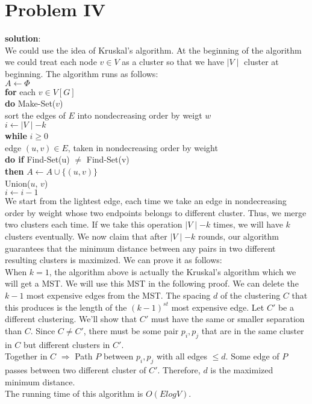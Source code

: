 \section{Problem IV}
\textbf{solution}:\\
We could use the idea of Kruskal's algorithm. At the beginning of the algorithm we could treat each node $v \in V$ as a cluster so that we have $\mid V \mid$ cluster at beginning. The algorithm runs as follows:\\

$A \gets \Phi$\\
\textbf{for} each $v \in V[G]$\\
\hspace*{0.6cm} \textbf{do} Make-Set($v$)\\
sort the edges of $E$ into nondecreasing order by weigt $w$\\
$i \gets \mid V \mid - k$\\
\textbf{while} $i \geq 0$\\
\hspace*{0.6cm} edge $(u, v) \in E$, taken in nondecreasing order by weight\\
\hspace*{0.6cm} \textbf{do if} Find-Set(u) $\neq$ Find-Set(v)\\
\hspace*{0.6cm} \hspace*{0.6cm} \hspace*{0.6cm} \textbf{then} $A \gets A \cup \{(u, v)\}$\\
\hspace*{0.6cm} \hspace*{0.6cm} \hspace*{0.6cm} Union($u$, $v$)\\
\hspace*{0.6cm} $i \gets i - 1$\\

We start from the lightest edge, each time we take an edge in nondecreasing order by weight whose two endpoints belongs to different cluster. Thus, we merge two clusters each time. If we take this operation $\mid V \mid - k$ times, we will have $k$ clusters eventually. We now claim that after $\mid V \mid - k$ rounds, our algorithm guarantees that the minimum distance between any pairs in two different resulting clusters is maximized. We can prove it as follows:\\

When $k = 1$, the algorithm above is actually the Kruskal's algorithm which we will get a MST. We will use this MST in the following proof. We can delete the $k - 1$ most expensive edges from the MST. The spacing $d$ of the clustering $C$ that this produces is the length of the $(k - 1)^{st}$ most expensive edge. Let $C'$ be a different clustering. We'll show that $C'$ must have the same or smaller separation than $C$. Since $C \neq C'$, there must be some pair $p_i, p_j$ that are in the same cluster in $C$ but different clusters in $C'$. \\

Together in $C$ $\Rightarrow$ Path $P$ between $p_i, p_j$ with all edges $\leq d$. Some edge of $P$ passes between two different cluster of $C'$. Therefore, $d$ is the maximized minimum distance. \\

The running time of this algorithm is $O(ElogV)$.






